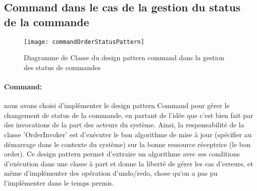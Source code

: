 \subsection{Command dans le cas de la gestion du status de la commande}

\begin{figure}[!ht]
\texttt{[image: commandOrderStatusPattern]}
\centering
\caption{Diagramme de Classe du design pattern command dans la gestion des status de commandes}
\label{uml:proxy}
\end{figure}

\paragraph{Command: } nous avons choisi d'implémenter le design pattern Command pour gérer le changement de status de la commande,
en partant de l'idée que c'est bien fait par des invocations de la part des acteurs du système. 
Ainsi, la responsabilité de la classe 'OrderInvoker' est d'exécuter le bon algorithme de mise à jour (spécifier au démarrage dans le contexte du système) sur la bonne ressource réceptrice (le bon order). 
Ce design pattern permet d'extraire un algorithme avec ses conditions d'exécution dans une classe à part et donne la liberté de gérer les cas d'erreurs, et même d'implémenter des opération d'undo/redo, chose qu'on a pas pu l'implémenter dans le temps permis.
